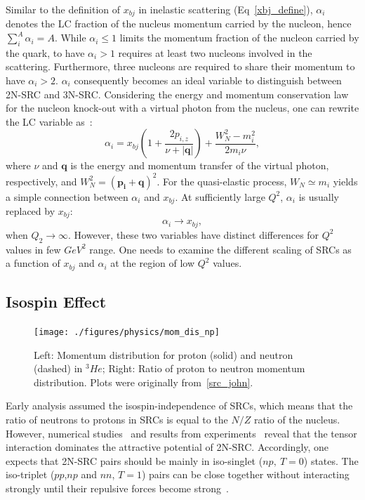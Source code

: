 Similar to the definition of $x_{bj}$ in inelastic scattering (Eq~\ref{xbj_define}), $\alpha_{i}$ denotes the LC fraction of the nucleus momentum carried by the nucleon, hence $\sum_{i}^{A}\alpha_{i}=A$. While $\alpha_{i}\leq 1$ limits the momentum fraction of the nucleon carried by the quark, to have $\alpha_{i}>1$ requires at least two nucleons involved in the scattering. Furthermore, three nucleons are required to share their momentum to have $\alpha_{i}>2$. $\alpha_{i}$ consequently becomes an ideal variable to distinguish between 2N-SRC and 3N-SRC. Considering the energy and momentum conservation law for the nucleon knock-out with a virtual photon from the nucleus, one can rewrite the LC variable as~\cite{src_john}:
\begin{equation}
  \alpha_{i}=x_{bj}\left(1+\frac{2p_{i,z}}{\nu+|\mathbf{q}|}\right)+\frac{W_{N}^{2}-m_{i}^{2}}{2m_{i}\nu},
  \label{alpha_xbj}
\end{equation}
where $\nu$ and $\mathbf{q}$ is the energy and momentum transfer of the virtual photon, respectively, and $W_{N}^{2}=(\mathbf{p_{i}}+\mathbf{q})^{2}$. For the quasi-elastic process, $W_{N}\simeq m_{i}$ yields a simple connection between $\alpha_{i}$ and $x_{bj}$. At sufficiently large $Q^{2}$, $\alpha_{i}$ is usually replaced by $x_{bj}$: 
\begin{equation}
  \alpha_{i}\rightarrow x_{bj}, 
\end{equation}
when $Q_{2}\rightarrow \infty$. However, these two variables have distinct differences for $Q^{2}$ values in few $GeV^{2}$ range. One needs to examine the different scaling of SRCs as a function of $x_{bj}$ and $\alpha_{i}$ at the region of low $Q^{2}$ values. 	
\subsection{Isospin Effect}
\begin{figure}[!ht]
  \begin{center}
    \texttt{[image: ./figures/physics/mom\_dis\_np]}
    \caption[Momentum distribution for proton and neutron and their ratio]{\footnotesize{Left: Momentum distribution for proton (solid) and neutron (dashed) in $^{3}He$; Right: Ratio of proton to neutron momentum distribution. Plots were originally from~\ref{src_john}.}}
    \label{mom_dis_np}
  \end{center}
\end{figure}   
Early analysis assumed the isospin-independence of SRCs, which means that the ratio of neutrons to protons in SRCs is equal to the $N/Z$ ratio of the nucleus. However, numerical studies~\cite{PhysRevC.72.054310} and results from experiments~\cite{Subedi:2008zz} reveal that the tensor interaction dominates the attractive potential of 2N-SRC. Accordingly, one expects that 2N-SRC pairs should be mainly in iso-singlet ($np,~T=0$) states. The iso-triplet ($pp$,$np$ and $nn$, $T=1$) pairs can be close together without interacting strongly until their repulsive forces become strong~\cite{src_john}.

